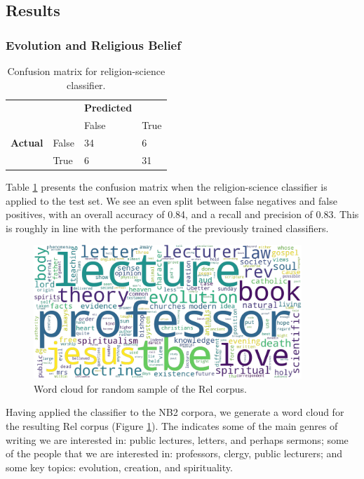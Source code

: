 \documentclass{article}
\begin{document}
\subsection{Results}\label{s:2qu-methods}

\subsubsection{Evolution and Religious Belief}

\begin{table}[]
  \centering
  \footnotesize
  \begin{tabular}{ll|ll}
  & & \textbf{Predicted} & \\
  & & False & True \\
  \hline
  \textbf{Actual} & False & 34 & 6 \\
  & True & 6 & 31 \\
  \end{tabular}
  \caption{Confusion matrix for religion-science classifier.}
  \label{t:rel-confusion}
\end{table}

Table \ref{t:rel-confusion} presents the confusion matrix when the religion-science classifier is applied to the test set. We see an even split between false negatives and false positives, with an overall accuracy of 0.84, and a recall and precision of 0.83. This is roughly in line with the performance of the previously trained classifiers.

\begin{figure}
  \centering
  \includegraphics[width=0.9\textwidth]{images/rel_v2_philoso_tf-idf.png}
  \caption{Word cloud for random sample of the Rel corpus.}
  \label{f:wc-rel}
\end{figure}

Having applied the classifier to the NB2 corpora, we generate a word cloud for the resulting Rel corpus (Figure \ref{f:wc-rel}). The indicates some of the main genres of writing we are interested in: public lectures, letters, and perhaps sermons; some of the people that we are interested in: professors, clergy, public lecturers; and some key topics: evolution, creation, and spirituality.
\end{document}
